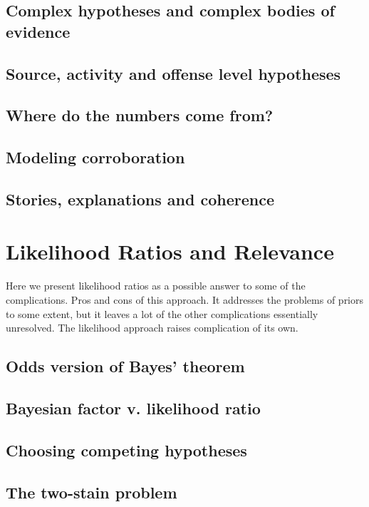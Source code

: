 \documentclass[]{book}
\begin{document}
\section{Complex hypotheses and complex bodies of evidence}

\section{Source, activity and offense level hypotheses}

\section{Where do the numbers come from?}

\section{Modeling corroboration}

\section{Stories, explanations and coherence}

\chapter{Likelihood Ratios and Relevance}

Here we present likelihood ratios as a possible answer to some of the
complications. Pros and cons of this approach. It addresses the problems
of priors to some extent, but it leaves a lot of the other complications
essentially unresolved. The likelihood approach raises complication of
its own.

\section{Odds version of Bayes' theorem}

\section{Bayesian factor v. likelihood ratio}

\section{Choosing competing hypotheses}

\section{The two-stain problem}
\end{document}
